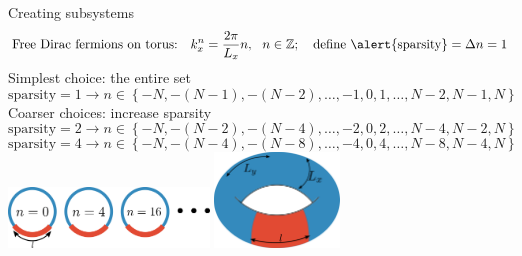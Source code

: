 \documentclass[8pt,aspectratio=169]{beamer}
\begin{document}
\begin{frame}{Creating subsystems}
	\[\text{Free Dirac fermions on torus:}~ ~ ~ k_x^n = \frac{2\pi }{L_x} n,~ ~ n \in \mathbb{Z};~~~ \text{define \alert{sparsity}} = \Delta n = 1\]
	\alert{Simplest} choice: the entire set
	\[\text{sparsity} = 1 \longrightarrow n \in \left\{-N,-(N-1),-(N-2),\ldots,-1,0,1,\ldots,N-2,N-1,N\right\} \]
	\alert{Coarser} choices: increase sparsity
	\[\text{sparsity} = 2 \longrightarrow n \in \left\{-N,-(N-2),-(N-4),\ldots,-2,0,2,\ldots,N-4,N-2,N\right\} \]
	\[\text{sparsity} = 4 \longrightarrow n \in \left\{-N,-(N-4),-(N-8),\ldots,-4,0,4,\ldots,N-8,N-4,N\right\} \]
	\centering
	\vspace*{\fill}
	\includegraphics[width=0.4\textwidth]{figures/A_mi.pdf}
	\hspace*{\fill}
	\includegraphics[width=0.25\textwidth]{figures/subsystem-torus.pdf}
\end{frame}
\end{document}
